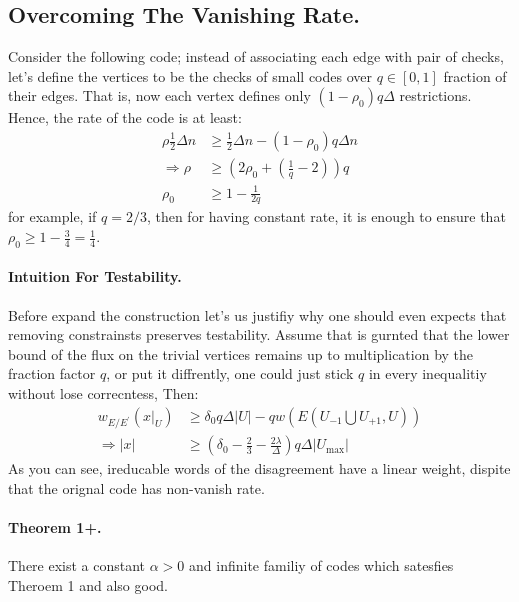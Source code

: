 \subsection { Overcoming The Vanishing Rate. } 
  Consider the following code; instead of associating each edge with pair of checks, let's define the vertices to be the checks of small codes over $q \in [0,1]$ fraction of their edges. That is, now each vertex defines only $\left( 1 - \rho_{0} \right)q\Delta$ restrictions. Hence, the rate of the code is at least:   
  \begin{equation*}
    \begin{split}
      \rho\frac{1}{2}\Delta n & \ge \frac{1}{2}\Delta n - \left(1 - \rho_{0} \right)q\Delta n \\
      \Rightarrow \rho & \ge \left(  2\rho_{0} + \left( \frac{1}{q}  - 2  \right)  \right)q \\ 
      \rho_{0} & \ge  1 - \frac{1}{2q} 
    \end{split}
  \end{equation*} for example, if $q = 2/3$, then for having constant rate, it is enough to ensure that $ \rho_{0} \ge 1 - \frac{3}{4} = \frac{1}{4}$.

 \paragraph{Intuition For Testability.} Before expand the construction let's us justifiy why one should even expects that removing constrainsts preserves testability. Assume that is gurnted that the lower bound of the flux on the trivial vertices remains up to multiplication by the fraction factor $q$, or put it diffrently, one could just stick $q$ in every inequalitiy without lose correcntess, Then: 
  \begin{equation*}
    \begin{split}
      w_{E/E^{\prime}}\left( x|_{U} \right) & \ge  \delta_{0}q\Delta|U| -qw\left( E(U_{-1} \bigcup U_{+1} ,U)  \right) \\ 
      \Rightarrow |x| & \ge \left(  \delta_{0} - \frac{2}{3} - \frac{2\lambda}{\Delta} \right) q \Delta|U_{\max}|
    \end{split}
  \end{equation*}
  As you can see, ireducable words of the disagreement have a linear weight, dispite that the orignal code has non-vanish rate.     
  
  \paragraph{Theorem 1+.} There exist a constant $\alpha > 0 $ and infinite familiy of codes which satesfies Theroem 1 and also good.

